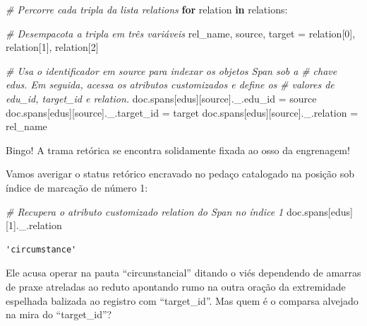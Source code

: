 \documentclass[
  brazilian,
]{article}
\newenvironment{Shaded}{}{}
\newcommand{\CommentTok}[1]{\textcolor[rgb]{0.38,0.63,0.69}{\textit{#1}}}
\newcommand{\ControlFlowTok}[1]{\textcolor[rgb]{0.00,0.44,0.13}{\textbf{#1}}}
\newcommand{\DecValTok}[1]{\textcolor[rgb]{0.25,0.63,0.44}{#1}}
\newcommand{\KeywordTok}[1]{\textcolor[rgb]{0.00,0.44,0.13}{\textbf{#1}}}
\newcommand{\NormalTok}[1]{#1}
\newcommand{\OperatorTok}[1]{\textcolor[rgb]{0.40,0.40,0.40}{#1}}
\newcommand{\StringTok}[1]{\textcolor[rgb]{0.25,0.44,0.63}{#1}}
\begin{document}
\begin{Shaded}
\begin{Highlighting}[]
\CommentTok{\# Percorre cada tripla da lista \textquotesingle{}relations\textquotesingle{}}
\ControlFlowTok{for}\NormalTok{ relation }\KeywordTok{in}\NormalTok{ relations:}
    
    \CommentTok{\# Desempacota a tripla em três variáveis}
\NormalTok{    rel\_name, source, target }\OperatorTok{=}\NormalTok{ relation[}\DecValTok{0}\NormalTok{], relation[}\DecValTok{1}\NormalTok{], relation[}\DecValTok{2}\NormalTok{]}
    
    \CommentTok{\# Usa o identificador em \textquotesingle{}source\textquotesingle{} para indexar os objetos Span sob a}
    \CommentTok{\# chave \textquotesingle{}edus\textquotesingle{}. Em seguida, acessa os atributos customizados e define os}
    \CommentTok{\# valores de \textquotesingle{}edu\_id\textquotesingle{}, \textquotesingle{}target\_id\textquotesingle{} e \textquotesingle{}relation\textquotesingle{}.}
\NormalTok{    doc.spans[}\StringTok{\textquotesingle{}edus\textquotesingle{}}\NormalTok{][source].\_.edu\_id }\OperatorTok{=}\NormalTok{ source}
\NormalTok{    doc.spans[}\StringTok{\textquotesingle{}edus\textquotesingle{}}\NormalTok{][source].\_.target\_id }\OperatorTok{=}\NormalTok{ target}
\NormalTok{    doc.spans[}\StringTok{\textquotesingle{}edus\textquotesingle{}}\NormalTok{][source].\_.relation }\OperatorTok{=}\NormalTok{ rel\_name}
\end{Highlighting}
\end{Shaded}

Bingo! A trama retórica se encontra solidamente fixada ao osso da
engrenagem!

Vamos averigar o status retórico encravado no pedaço catalogado na
posição sob índice de marcação de número 1:

\begin{Shaded}
\begin{Highlighting}[]
\CommentTok{\# Recupera o atributo customizado \textquotesingle{}relation\textquotesingle{} do Span no índice 1}
\NormalTok{doc.spans[}\StringTok{\textquotesingle{}edus\textquotesingle{}}\NormalTok{][}\DecValTok{1}\NormalTok{].\_.relation}
\end{Highlighting}
\end{Shaded}

\begin{verbatim}
'circumstance'
\end{verbatim}

Ele acusa operar na pauta ``circunstancial'' ditando o viés dependendo
de amarras de praxe atreladas ao reduto apontando rumo na outra oração
da extremidade espelhada balizada ao registro com ``target\_id''. Mas
quem é o comparsa alvejado na mira do ``target\_id''?
\end{document}
